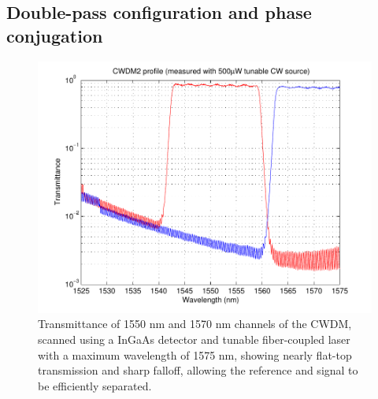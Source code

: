 \subsection{Double-pass configuration and phase conjugation}

\begin{figure}[h]
\begin{center}
\includegraphics[width=12cm]{figure-pcoct-cwdm.pdf}
\caption{Transmittance of 1550 nm and 1570 nm channels of the CWDM, scanned using a InGaAs detector and tunable fiber-coupled laser with a maximum wavelength of 1575 nm, showing nearly flat-top transmission and sharp falloff, allowing the reference and signal to be efficiently separated.}
\label{figure:pcoct-cwdm}
\end{center}
\end{figure}

